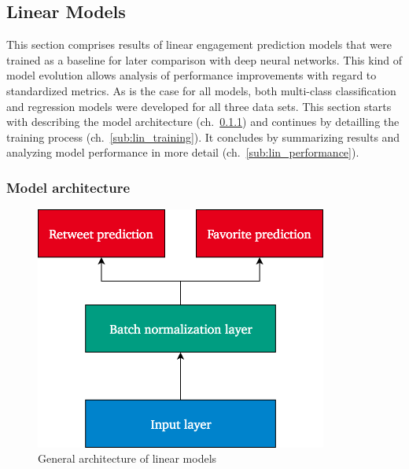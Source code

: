 \subsection{Linear Models}
\label{sec:linear_models}

This section comprises results of linear engagement prediction models that
were trained as a baseline for later comparison with deep neural networks.
This kind of model evolution allows analysis of performance improvements
with regard to standardized metrics.
As is the case for all models, both multi-class classification and regression
models were developed for all three data sets.
This section starts with describing the model architecture (ch.~\ref{sub:lin_architecture}) and continues by detailling the training process (ch.~\ref{sub:lin_training}).
It concludes by summarizing results and analyzing model performance in more detail
(ch.~\ref{sub:lin_performance}).

\subsubsection{Model architecture}
\label{sub:lin_architecture}

\begin{figure}[h]
  \centering
  \includegraphics[height=8cm]{img/linear_model_architecture}
  \caption{General architecture of linear models}
\label{fig:linear_model_architecture}
\end{figure}


